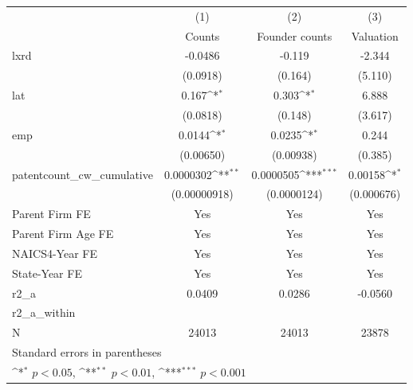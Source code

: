 {
\def\sym#1{\ifmmode^{#1}\else\(^{#1}\)\fi}
\begin{tabular}{l*{3}{c}}
\hline\hline
            &\multicolumn{1}{c}{(1)}&\multicolumn{1}{c}{(2)}&\multicolumn{1}{c}{(3)}\\
            &\multicolumn{1}{c}{Counts}&\multicolumn{1}{c}{Founder counts}&\multicolumn{1}{c}{Valuation}\\
\hline
lxrd        &     -0.0486         &      -0.119         &      -2.344         \\
            &    (0.0918)         &     (0.164)         &     (5.110)         \\
[1em]
lat         &       0.167\sym{*}  &       0.303\sym{*}  &       6.888         \\
            &    (0.0818)         &     (0.148)         &     (3.617)         \\
[1em]
emp         &      0.0144\sym{*}  &      0.0235\sym{*}  &       0.244         \\
            &   (0.00650)         &   (0.00938)         &     (0.385)         \\
[1em]
patentcount\_cw\_cumulative&   0.0000302\sym{**} &   0.0000505\sym{***}&     0.00158\sym{*}  \\
            &(0.00000918)         & (0.0000124)         &  (0.000676)         \\
[1em]
Parent Firm FE&         Yes         &         Yes         &         Yes         \\
[1em]
Parent Firm Age FE&         Yes         &         Yes         &         Yes         \\
[1em]
NAICS4-Year FE&         Yes         &         Yes         &         Yes         \\
[1em]
State-Year FE&         Yes         &         Yes         &         Yes         \\
\hline
r2\_a        &      0.0409         &      0.0286         &     -0.0560         \\
r2\_a\_within &                     &                     &                     \\
N           &       24013         &       24013         &       23878         \\
\hline\hline
\multicolumn{4}{l}{\footnotesize Standard errors in parentheses}\\
\multicolumn{4}{l}{\footnotesize \sym{*} \(p<0.05\), \sym{**} \(p<0.01\), \sym{***} \(p<0.001\)}\\
\end{tabular}
}
